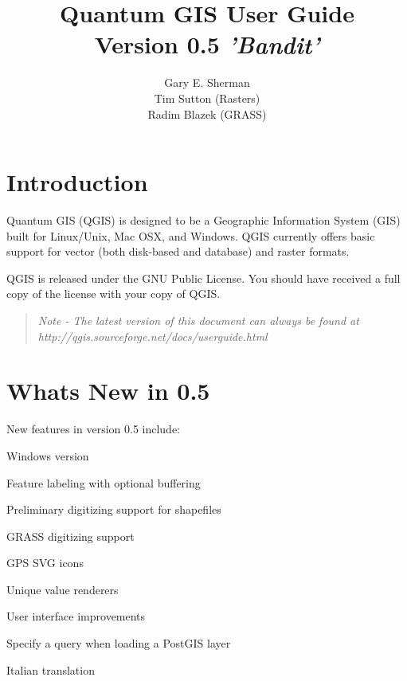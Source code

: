 \documentclass[10pt,english]{article}
\title{Quantum GIS User Guide\\
\large Version 0.5 \textsl{'Bandit'}}
\author{Gary E. Sherman \\Tim Sutton (Rasters) \\Radim Blazek (GRASS)}
\begin{document}
\setlength{\parindent}{0in}


\maketitle
\tableofcontents
{}

\pagestyle{fancy}


\begin{onehalfspace}
\reversemarginpar
\section{Introduction}
Quantum GIS (QGIS) is designed to be a Geographic Information System
(GIS) built for Linux/Unix, Mac OSX, and Windows. QGIS currently offers basic support for
vector (both disk-based and database) and raster formats. 

QGIS is released under the GNU Public License. You should have received a full copy of the license with your copy of QGIS.
\begin{quote}
\begin{singlespace}
\textsl{Note - The latest version of this document can always be found at\\
http://qgis.sourceforge.net/docs/userguide.html }
\end{singlespace}
\end{quote}
\section{Whats New in 0.5}
New features in version 0.5 include:
\begin{compactenum}
\item Windows version
\item Feature labeling with optional buffering
\item Preliminary digitizing support for shapefiles
\item GRASS digitizing support
\item GPS SVG icons
\item Unique value renderers
\item User interface improvements
\item Specify a query when loading a PostGIS layer
\item Italian translation

\end{compactenum}

\end{onehalfspace}
\end{document}
